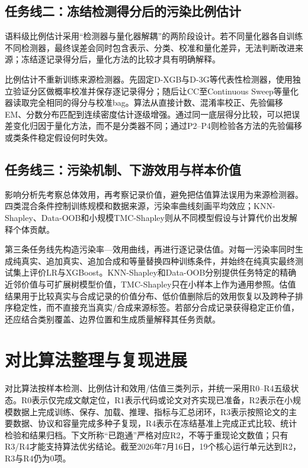 \documentclass[
  chinese,
  12pt,
  a4paper,
  chinese,
  UTF8]{ctexart}
\begin{document}
\subsection{任务线二：冻结检测得分后的污染比例估计}\label{ux4efbux52a1ux7ebfux4e8cux51bbux7ed3ux68c0ux6d4bux5f97ux5206ux540eux7684ux6c61ux67d3ux6bd4ux4f8bux4f30ux8ba1}

语料级比例估计采用``检测器与量化器解耦''的两阶段设计。若不同量化器各自训练不同检测器，最终误差会同时包含表示、分类、校准和量化差异，无法判断改进来源；冻结逐记录得分后，量化方法的比较才具有明确解释。

比例估计不重新训练来源检测器。先固定D-XGB与D-3G等代表性检测器，使用独立验证分区做概率校准并保存逐记录得分；随后让CC至Continuous
Sweep等量化器读取完全相同的得分与校准bag。算法从直接计数、混淆率校正、先验偏移EM、分数分布匹配到连续密度估计逐级增强。通过同一底层得分比较，可以把误差变化归因于量化方法，而不是分类器不同；通过P2--P4则检验各方法的先验偏移或类条件稳定假设何时失效。

\subsection{任务线三：污染机制、下游效用与样本价值}\label{ux4efbux52a1ux7ebfux4e09ux6c61ux67d3ux673aux5236ux4e0bux6e38ux6548ux7528ux4e0eux6837ux672cux4ef7ux503c}

影响分析先考察总体效用，再考察记录价值，避免把估值算法误用为来源检测器。四类混合条件控制训练规模和数据来源，污染率曲线刻画平均效应；KNN-Shapley、Data-OOB和小规模TMC-Shapley则从不同模型假设与计算代价出发解释个体贡献。

第三条任务线先构造污染率---效用曲线，再进行逐记录估值。对每一污染率同时生成纯真实、追加真实、追加合成和等量替换四种训练条件，并始终在纯真实最终测试集上评价LR与XGBoost。KNN-Shapley和Data-OOB分别提供任务特定的精确近邻价值与可扩展树模型价值，TMC-Shapley只在小样本上作为通用参照。估值结果用于比较真实与合成记录的价值分布、低价值删除后的效用恢复以及跨种子排序稳定性，而不直接充当真实/合成来源标签。若部分合成记录获得稳定正价值，还应结合类别覆盖、边界位置和生成质量解释其任务贡献。

\section{对比算法整理与复现进展}\label{ux5bf9ux6bd4ux7b97ux6cd5ux6574ux7406ux4e0eux590dux73b0ux8fdbux5c55}

对比算法按样本检测、比例估计和效用/估值三类列示，并统一采用R0--R4五级状态。R0表示仅完成文献定位，R1表示代码或论文对齐实现已准备，R2表示在小规模数据上完成训练、保存、加载、推理、指标与汇总闭环，R3表示按照论文的主要数据、协议和容量完成多种子复现，R4表示在冻结基准上完成正式比较、统计检验和结果归档。下文所称``已跑通''严格对应R2，不等于重现论文数值；只有R3/R4才能支持算法优劣结论。截至2026年7月16日，19个核心运行单元达到R2，R3与R4仍为0项。
\end{document}
